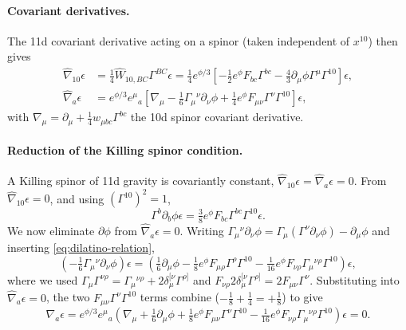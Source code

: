\paragraph{Covariant derivatives.}
The 11d covariant derivative acting on a spinor (taken independent of $x^{10}$) then gives
\begin{align}
\hat\nabla_{10} \epsilon
&=\tfrac{1}{4}\hat W_{10,BC}\Gamma^{BC}\epsilon
=\tfrac{1}{4}e^{\phi/3}\left[
-\tfrac{1}{2}e^{\phi}F_{bc}\Gamma^{bc}-\tfrac{4}{3}\partial_\mu\phi  \Gamma^\mu \Gamma^{10}
\right]\epsilon,\\
\hat\nabla_a \epsilon
&=e^{\phi/3}e^\mu{}_a
\left[
\nabla_\mu
-\tfrac{1}{6}\Gamma_\mu{}^\nu\partial_\nu\phi+\tfrac{1}{4}e^\phi F_{\mu\nu}\Gamma^\nu\Gamma^{10}
\right]\epsilon ,
\end{align}
with $\nabla_\mu=\partial_\mu+\tfrac14 w_{\mu bc}\Gamma^{bc}$ the 10d spinor covariant derivative.

\paragraph{Reduction of the Killing spinor condition.}
A Killing spinor of 11d gravity is covariantly constant, $\hat\nabla_{10}\epsilon=\hat\nabla_a\epsilon=0$. From $\hat\nabla_{10}\epsilon=0$, and using $(\Gamma^{10})^2=1$,
\begin{equation}
\Gamma^b\partial_b\phi \epsilon=\tfrac{3}{8}e^\phi F_{bc}\Gamma^{bc}\Gamma^{10}\epsilon .
\label{eq:dilatino-relation}
\end{equation}
We now eliminate $\partial\phi$ from $\hat\nabla_a\epsilon=0$. Writing $\Gamma_\mu{}^\nu\partial_\nu\phi=\Gamma_\mu(\Gamma^\nu\partial_\nu\phi)-\partial_\mu\phi$ and inserting \eqref{eq:dilatino-relation},
\begin{equation}
\left(-\tfrac{1}{6}\Gamma_\mu{}^\nu\partial_\nu\phi\right)\epsilon
=
\left(\tfrac{1}{6}\partial_\mu\phi-\tfrac{1}{8}e^\phi F_{\mu\rho}\Gamma^\rho \Gamma^{10}-\tfrac{1}{16}e^\phi F_{\nu\rho}\Gamma_\mu{}^{\nu\rho}\Gamma^{10}\right)\epsilon ,
\end{equation}
where we used $\Gamma_\mu\Gamma^{\nu\rho}=\Gamma_\mu{}^{\nu\rho}+2\delta_\mu^{[\nu}\Gamma^{\rho]}$ and $F_{\nu\rho} 2\delta_\mu^{[\nu}\Gamma^{\rho]}=2F_{\mu\nu}\Gamma^\nu$. Substituting into $\hat\nabla_a\epsilon=0$, the two $F_{\mu\nu}\Gamma^\nu\Gamma^{10}$ terms combine ($-\tfrac18+\tfrac14=+\tfrac18$) to give
\begin{equation}
\nabla_a\epsilon=e^{\phi/3}e^\mu{}_a
\left(
\nabla_\mu+\tfrac{1}{6}\partial_\mu\phi
+\tfrac{1}{8}e^\phi F_{\mu\nu}\Gamma^\nu\Gamma^{10}-\tfrac{1}{16}e^\phi F_{\nu\rho}\Gamma_\mu{}^{\nu\rho}\Gamma^{10}
\right)\epsilon=0 .
\label{eq:assembled}
\end{equation}

